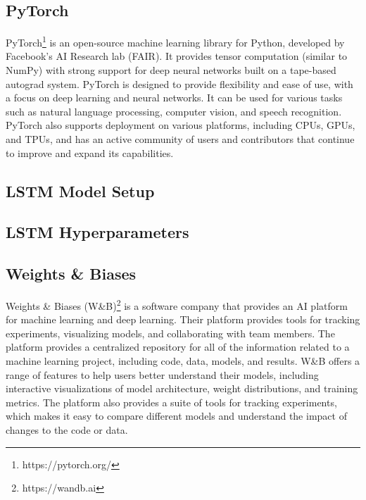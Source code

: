   \subsection{PyTorch}
  \label{sec:pytorch-evaluation-setup}
    PyTorch\footnote{https://pytorch.org/} is an open-source machine learning library for Python, developed by Facebook's AI Research lab (FAIR). It provides tensor computation (similar to NumPy) with strong support for deep neural networks built on a tape-based autograd system. PyTorch is designed to provide flexibility and ease of use, with a focus on deep learning and neural networks. It can be used for various tasks such as natural language processing, computer vision, and speech recognition.
    PyTorch also supports deployment on various platforms, including CPUs, GPUs, and TPUs, and has an active community of users and contributors that continue to improve and expand its capabilities.
  

  \subsection{LSTM Model Setup}

  \subsection{LSTM Hyperparameters}
  \label{sec:lstm-hyperparameters-evaluation-setup}


  \subsection{Weights \& Biases}
  \label{sec:wandb-evaluation-setup}
    
    Weights \& Biases (W\&B)\footnote{https://wandb.ai} is a software company that provides an AI platform for machine learning and deep learning. Their platform provides tools for tracking experiments, visualizing models, and collaborating with team members.
    The platform provides a centralized repository for all of the information related to a machine learning project, including code, data, models, and results.
    W\&B offers a range of features to help users better understand their models, including interactive visualizations of model architecture, weight distributions, and training metrics. The platform also provides a suite of tools for tracking experiments, which makes it easy to compare different models and understand the impact of changes to the code or data.



